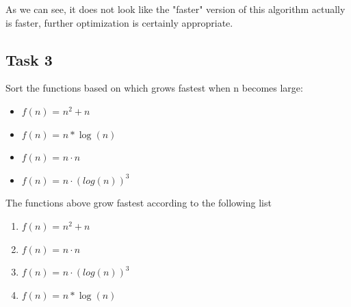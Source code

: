 \documentclass{article}
\begin{document}
As we can see, it does not look like the "faster" version of this algorithm actually is faster, further optimization is certainly appropriate.

\subsection{Task 3}
Sort the functions based on which grows fastest when n becomes large:

\begin{itemize}
\item \(f(n)\) = \( n^2 + n \)
\item \(f(n)\) = \( n * \log (n) \)
\item \(f(n)\) = \( n \cdot  n \)
\item \(f(n)\) = \( n \cdot  (log(n))^3 \)
\end{itemize}
\newpage 

The functions above grow fastest according to the following list

\begin{enumerate}
    \item \(f(n)\) = \( n^2 + n \)
    \item \(f(n)\) = \( n \cdot  n \)
    \item \(f(n)\) = \( n \cdot  (log(n))^3 \)
    \item \(f(n)\) = \( n * \log (n) \)
\end{enumerate}
\end{document}
